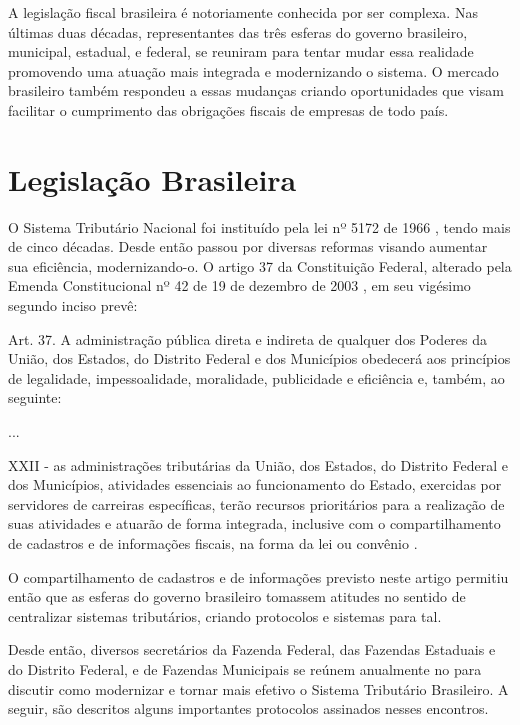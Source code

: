
A legislação fiscal brasileira é notoriamente conhecida por ser complexa. Nas últimas duas décadas, representantes das três esferas do governo brasileiro, municipal, estadual, e federal, se reuniram para tentar mudar essa realidade promovendo uma atuação mais integrada e modernizando o sistema. O mercado brasileiro também respondeu a essas mudanças criando oportunidades que visam facilitar o cumprimento das obrigações fiscais de empresas de todo país.

\section{Legislação Brasileira}

O Sistema Tributário Nacional foi instituído pela lei nº 5172 de 1966 \cite{lei:1966:codigo_tributario}, tendo mais de cinco décadas. Desde então passou por diversas reformas visando aumentar sua eficiência, modernizando-o. O artigo 37 da Constituição Federal, alterado pela Emenda Constitucional nº 42 de 19 de dezembro de 2003 \cite{constituicao:emenda42_2003}, em seu vigésimo segundo inciso prevê:

\begin{citacao}
Art. 37. A administração pública direta e indireta de qualquer dos Poderes da União, dos Estados, do Distrito Federal e dos Municípios obedecerá aos princípios de legalidade, impessoalidade, moralidade, publicidade e eficiência e, também, ao seguinte:

...

XXII - as administrações tributárias da União, dos Estados, do Distrito Federal e dos Municípios, atividades essenciais ao funcionamento do Estado, exercidas por servidores de carreiras específicas, terão recursos prioritários para a realização de suas atividades e atuarão de forma integrada, inclusive com o compartilhamento de cadastros e de informações fiscais, na forma da lei ou convênio \cite{constituicao:1988}.
\end{citacao}

O compartilhamento de cadastros e de informações previsto neste artigo permitiu então que as esferas do governo brasileiro tomassem atitudes no sentido de centralizar sistemas tributários, criando protocolos e sistemas para tal.

Desde então, diversos secretários da Fazenda Federal, das Fazendas Estaduais e do Distrito Federal, e de Fazendas Municipais se reúnem anualmente no  para discutir como modernizar e tornar mais efetivo o Sistema Tributário Brasileiro. A seguir, são descritos alguns importantes protocolos assinados nesses encontros.

